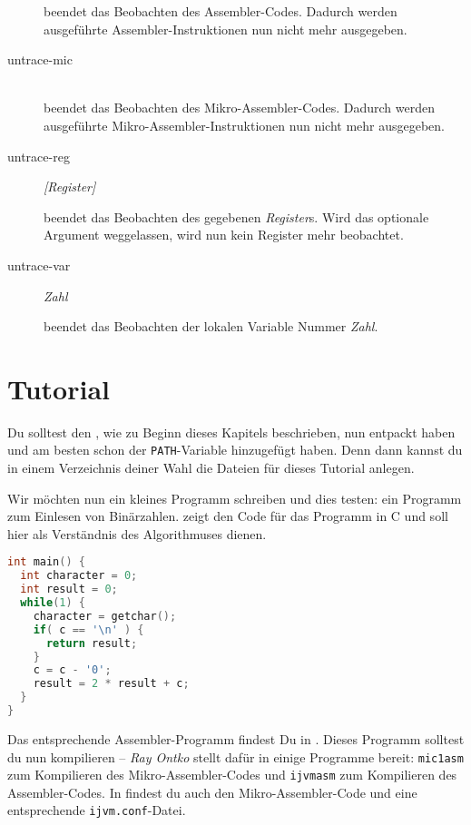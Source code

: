 \begin{description}
  beendet das Beobachten des Assembler-Codes. Dadurch werden ausgeführte Assembler-Instruktionen nun nicht mehr ausgegeben.

\item[untrace-mic] \hspace*{\fill}\\

  beendet das Beobachten des Mikro-Assembler-Codes. Dadurch werden ausgeführte Mikro-Assembler-Instruktionen nun nicht mehr ausgegeben.

\item[untrace-reg] \emph{[Register]}

  beendet das Beobachten des gegebenen \emph{Register}s. Wird das optionale Argument weggelassen, wird nun kein Register mehr beobachtet.

\item[untrace-var] \emph{Zahl}

  beendet das Beobachten der lokalen Variable Nummer \emph{Zahl}.
\end{description}

\section{Tutorial}
Du solltest den \md{}, wie zu Beginn dieses Kapitels beschrieben, nun entpackt haben und am besten schon der \texttt{PATH}-Variable hinzugefügt haben. Denn dann kannst du in einem Verzeichnis deiner Wahl die Dateien für dieses Tutorial anlegen.

Wir möchten nun ein kleines Programm schreiben und dies testen: ein Programm zum Einlesen von Binärzahlen.  zeigt den Code für das Programm in C und soll hier als Verständnis des Algorithmuses dienen.

\begin{lstlisting}[language=c,caption={C-Programm zum Einlesen einer Binärzahl},label=\lstlbl{binary-read-c}]
int main() {
  int character = 0;
  int result = 0;
  while(1) {
    character = getchar();
    if( c == '\n' ) {
      return result;
    }
    c = c - '0';
    result = 2 * result + c;
  }
}
\end{lstlisting}

Das entsprechende Assembler-Programm findest Du in . Dieses Programm solltest du nun kompilieren -- \emph{Ray Ontko} stellt dafür in \cite{Ontko1999} einige Programme bereit: \texttt{mic1asm} zum Kompilieren des Mikro-Assembler-Codes und \texttt{ijvmasm} zum Kompilieren des Assembler-Codes. In \cite{Ontko1999} findest du auch den Mikro-Assembler-Code und eine entsprechende \texttt{ijvm.conf}-Datei.

